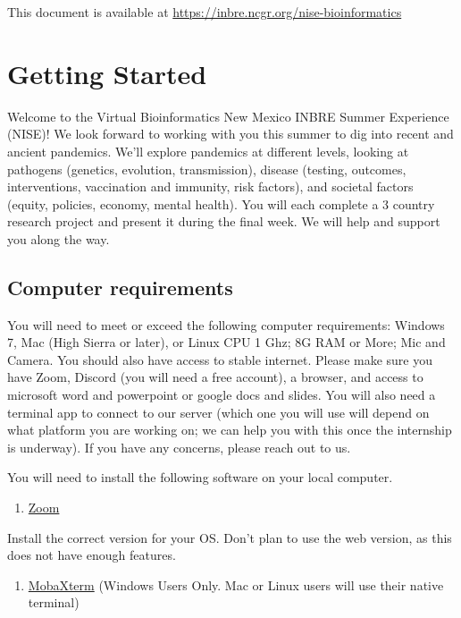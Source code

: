 \documentclass[
]{book}
\providecommand{\tightlist}{%
  \setlength{\itemsep}{0pt}\setlength{\parskip}{0pt}}
\begin{document}
This document is available at \url{https://inbre.ncgr.org/nise-bioinformatics}

\hypertarget{getting-started}{%
\chapter{Getting Started}\label{getting-started}}

Welcome to the Virtual Bioinformatics New Mexico INBRE Summer Experience (NISE)! We look forward to working with you this summer to dig into recent and ancient pandemics. We'll explore pandemics at different levels, looking at pathogens (genetics, evolution, transmission), disease (testing, outcomes, interventions, vaccination and immunity, risk factors), and societal factors (equity, policies, economy, mental health). You will each complete a 3 country research project and present it during the final week. We will help and support you along the way.

\hypertarget{computer-requirements}{%
\section{Computer requirements}\label{computer-requirements}}

You will need to meet or exceed the following computer requirements: Windows 7, Mac (High Sierra or later), or Linux CPU 1 Ghz; 8G RAM or More; Mic and Camera. You should also have access to stable internet. Please make sure you have Zoom, Discord (you will need a free account), a browser, and access to microsoft word and powerpoint or google docs and slides. You will also need a terminal app to connect to our server (which one you will use will depend on what platform you are working on; we can help you with this once the internship is underway). If you have any concerns, please reach out to us.

You will need to install the following software on your local computer.

\begin{enumerate}
\def\labelenumi{\arabic{enumi}.}
\tightlist
\item
  \href{https://zoom.us/download}{Zoom}
\end{enumerate}

Install the correct version for your OS. Don't plan to use the web version, as this does not have enough features.

\begin{enumerate}
\def\labelenumi{\arabic{enumi}.}
\setcounter{enumi}{1}
\tightlist
\item
  \href{https://mobaxterm.mobatek.net/download.html}{MobaXterm} (Windows Users Only. Mac or Linux users will use their native terminal)
\end{enumerate}
\end{document}
